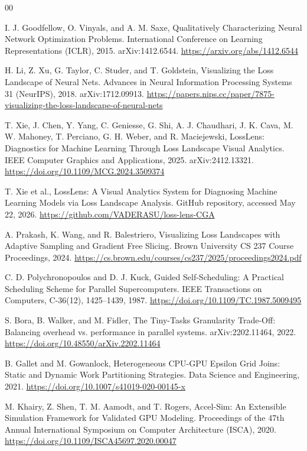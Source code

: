 \documentclass[conference]{IEEEtran}
\begin{document}
\begin{thebibliography}{00}

I. J. Goodfellow, O. Vinyals, and A. M. Saxe, Qualitatively
Characterizing Neural Network Optimization Problems.
International Conference on Learning Representations (ICLR),
2015. arXiv:1412.6544.
\url{https://arxiv.org/abs/1412.6544}

H. Li, Z. Xu, G. Taylor, C. Studer, and T. Goldstein,
Visualizing the Loss Landscape of Neural Nets. Advances in
Neural Information Processing Systems 31 (NeurIPS), 2018.
arXiv:1712.09913.
\url{https://papers.nips.cc/paper/7875-visualizing-the-loss-landscape-of-neural-nets}

T. Xie, J. Chen, Y. Yang, C. Geniesse, G. Shi, A. J. Chaudhari, J. K.
Cava, M. W. Mahoney, T. Perciano, G. H. Weber, and R. Maciejewski,
LossLens: Diagnostics for Machine Learning Through Loss Landscape
Visual Analytics. IEEE Computer Graphics and Applications, 2025.
arXiv:2412.13321.
\url{https://doi.org/10.1109/MCG.2024.3509374}

T. Xie et al., LossLens: A Visual Analytics System for Diagnosing
Machine Learning Models via Loss Landscape Analysis. GitHub
repository, accessed May 22, 2026.
\url{https://github.com/VADERASU/loss-lens-CGA}

A. Prakash, K. Wang, and R. Balestriero,
Visualizing Loss Landscapes with Adaptive Sampling and
Gradient Free Slicing. Brown University CS 237 Course
Proceedings, 2024.
\url{https://cs.brown.edu/courses/cs237/2025/proceedings2024.pdf}

C. D. Polychronopoulos and D. J. Kuck, Guided Self-Scheduling: A
Practical Scheduling Scheme for Parallel Supercomputers. IEEE
Transactions on Computers, C-36(12), 1425--1439, 1987.
\url{https://doi.org/10.1109/TC.1987.5009495}

S. Bora, B. Walker, and M. Fidler, The Tiny-Tasks Granularity
Trade-Off: Balancing overhead vs. performance in parallel systems.
arXiv:2202.11464, 2022.
\url{https://doi.org/10.48550/arXiv.2202.11464}

B. Gallet and M. Gowanlock, Heterogeneous CPU-GPU Epsilon Grid
Joins: Static and Dynamic Work Partitioning Strategies. Data Science
and Engineering, 2021.
\url{https://doi.org/10.1007/s41019-020-00145-x}

M. Khairy, Z. Shen, T. M. Aamodt, and T. Rogers, Accel-Sim: An
Extensible Simulation Framework for Validated GPU Modeling. Proceedings
of the 47th Annual International Symposium on Computer Architecture
(ISCA), 2020. \url{https://doi.org/10.1109/ISCA45697.2020.00047}


\end{thebibliography}
\end{document}
